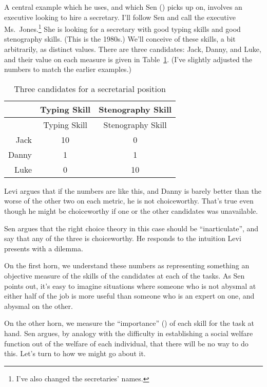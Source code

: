 \documentclass[
  10.5pt,
  twoside]{article}
\begin{document}
A central example which he uses, and which Sen
() picks up on, involves an executive
looking to hire a secretary. I'll follow Sen and call the executive
Ms.~Jones.\footnote{I've also changed the secretaries' names.} She is
looking for a secretary with good typing skills and good stenography
skills. (This is the 1980s.) We'll conceive of these skills, a bit
arbitrarily, as distinct values. There are three candidates: Jack,
Danny, and Luke, and their value on each measure is given in
Table~\ref{tbl-secretaries}. (I've slightly adjusted the numbers to
match the earlier examples.)

\begin{longtable}[]{@{}rcc@{}}
\caption{Three candidates for a secretarial
position}\label{tbl-secretaries}\tabularnewline
\toprule\noalign{}
& Typing Skill & Stenography Skill \\
\midrule\noalign{}
\endfirsthead
\toprule\noalign{}
& Typing Skill & Stenography Skill \\
\midrule\noalign{}
\endhead
\bottomrule\noalign{}
\endlastfoot
Jack & 10 & 0 \\
Danny & 1 & 1 \\
Luke & 0 & 10 \\
\end{longtable}

Levi argues that if the numbers are like this, and Danny is barely
better than the worse of the other two on each metric, he is not
choiceworthy. That's true even though he might be choiceworthy if one or
the other candidates was unavailable.

Sen argues that the right choice theory in this case should be
``inarticulate'', and say that any of the three is choiceworthy. He
responds to the intuition Levi presents with a dilemma.

On the first horn, we understand these numbers as representing something
an objective measure of the skills of the candidates at each of the
tasks. As Sen points out, it's easy to imagine situations where someone
who is not abysmal at either half of the job is more useful than someone
who is an expert on one, and abysmal on the other.

On the other horn, we measure the ``importance''
() of each skill for the task at
hand. Sen argues, by analogy with the difficulty in establishing a
social welfare function out of the welfare of each individual, that
there will be no way to do this. Let's turn to how we might go about it.
\end{document}
